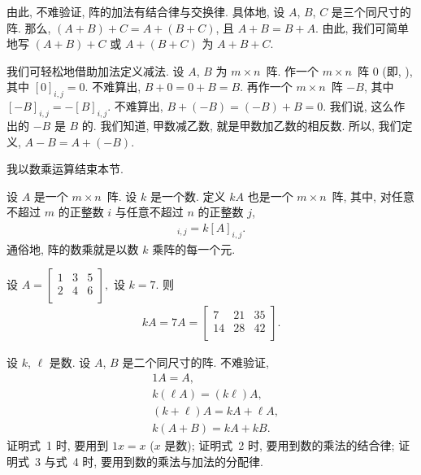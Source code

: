 \documentclass[%
    UTF8,%
    fontset=none,%
    punct=kaiming,%
    zihao=-4,%
    a4paper,%
    oneside,%
]{ctexbook}
\let\emph\relax
\begin{document}
由此, 不难验证, 阵的加法有结合律与交换律.
具体地, 设 \(A\), \(B\), \(C\) 是三个同尺寸的阵.
那么,
\((A + B) + C = A + (B + C)\),
且
\(A + B = B + A\).
由此, 我们可简单地写
\((A + B) + C\) 或 \(A + (B + C)\)
为 \(A + B + C\).

我们可轻松地借助加法定义减法.
设 \(A\), \(B\) 为 \(m \times n\)~阵.
作一个 \(m \times n\)~阵 \(0\)
(即, \emph{零阵}),
其中 \([0]_{i,j} = 0\).
不难算出, \(B + 0 = 0 + B = B\).
再作一个 \(m \times n\)~阵 \(-B\),
其中 \([-B]_{i,j} = -[B]_{i,j}\).
不难算出, \(B + (-B) = (-B) + B = 0\).
我们说, 这么作出的 \(-B\) 是 \(B\) 的\emph{相反阵}.
我们知道, 甲数减乙数, 就是甲数加乙数的相反数.
所以, 我们定义, \(A - B = A + (-B)\).

\vspace{2ex}

我以数乘运算结束本节.

\begin{definition}[阵的数乘]
    设 \(A\) 是一个 \(m \times n\)~阵.
    设 \(k\) 是一个数.
    定义 \(kA\) 也是一个 \(m \times n\)~阵,
    其中, 对任意不超过 \(m\) 的正整数 \(i\)
    与任意不超过 \(n\) 的正整数 \(j\),
    \begin{align*}
        [kA]_{i,j} = k[A]_{i,j}.
    \end{align*}
    通俗地, 阵的数乘就是以数 \(k\) 乘阵的每一个元.
\end{definition}

\begin{example}
    设
    \(
    A = \begin{bmatrix}
        1 & 3 & 5 \\
        2 & 4 & 6 \\
    \end{bmatrix},
    \)
    设 \(k = 7\).
    则
    \begin{align*}
        kA = 7A =
        \begin{bmatrix}
            7  & 21 & 35 \\
            14 & 28 & 42 \\
        \end{bmatrix}.
    \end{align*}
\end{example}

设 \(k\), \(\ell\) 是数.
设 \(A\), \(B\) 是二个同尺寸的阵.
不难验证,
\begin{align*}
     & 1A = A,                     \\
     & k(\ell A) = (k\ell) A,      \\
     & (k + \ell) A = kA + \ell A, \\
     & k(A + B) = kA + kB.
\end{align*}
证明式~1 时, 要用到 \(1x = x\) (\(x\) 是数);
证明式~2 时, 要用到数的乘法的结合律;
证明式~3 与式~4 时, 要用到数的乘法与加法的分配律.
\end{document}
